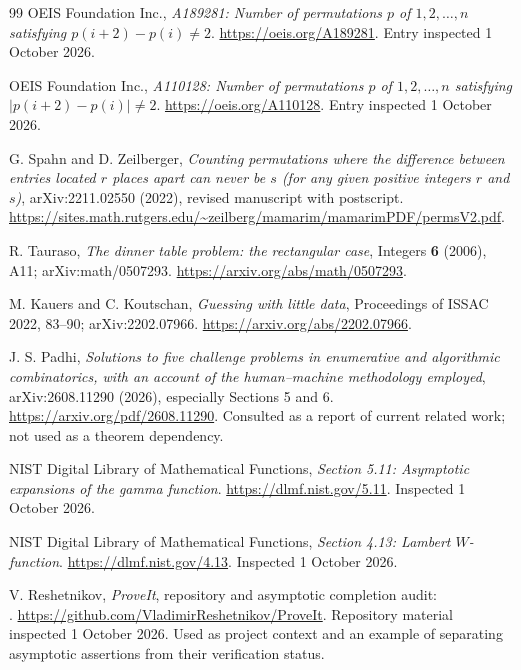 \documentclass[11pt]{article}
\numberwithin{equation}{section}
\theoremstyle{definition}
\theoremstyle{remark}
\theoremstyle{definition}
\begin{document}
\begin{thebibliography}{99}
OEIS Foundation Inc., \emph{A189281: Number of permutations $p$ of
$1,2,\ldots,n$ satisfying $p(i+2)-p(i)\ne2$}.
\url{https://oeis.org/A189281}. Entry inspected 1 October 2026.

OEIS Foundation Inc., \emph{A110128: Number of permutations $p$ of
$1,2,\ldots,n$ satisfying $|p(i+2)-p(i)|\ne2$}.
\url{https://oeis.org/A110128}. Entry inspected 1 October 2026.

G. Spahn and D. Zeilberger,
\emph{Counting permutations where the difference between entries located
$r$ places apart can never be $s$ (for any given positive integers $r$ and $s$)},
arXiv:2211.02550 (2022), revised manuscript with postscript.
\url{https://sites.math.rutgers.edu/~zeilberg/mamarim/mamarimPDF/permsV2.pdf}.

R. Tauraso, \emph{The dinner table problem: the rectangular case},
Integers \textbf{6} (2006), A11; arXiv:math/0507293.
\url{https://arxiv.org/abs/math/0507293}.

M. Kauers and C. Koutschan, \emph{Guessing with little data},
Proceedings of ISSAC 2022, 83--90; arXiv:2202.07966.
\url{https://arxiv.org/abs/2202.07966}.

J. S. Padhi, \emph{Solutions to five challenge problems in enumerative and
algorithmic combinatorics, with an account of the human--machine methodology
employed}, arXiv:2608.11290 (2026), especially Sections 5 and 6.
\url{https://arxiv.org/pdf/2608.11290}. Consulted as a report of current
related work; not used as a theorem dependency.

NIST Digital Library of Mathematical Functions,
\emph{Section 5.11: Asymptotic expansions of the gamma function}.
\url{https://dlmf.nist.gov/5.11}. Inspected 1 October 2026.

NIST Digital Library of Mathematical Functions,
\emph{Section 4.13: Lambert $W$-function}.
\url{https://dlmf.nist.gov/4.13}. Inspected 1 October 2026.

V. Reshetnikov, \emph{ProveIt}, repository and asymptotic completion audit:\\
.
\url{https://github.com/VladimirReshetnikov/ProveIt}.
Repository material inspected 1 October 2026. Used as project context and an
example of separating asymptotic assertions from their verification status.


\end{thebibliography}
\end{document}
